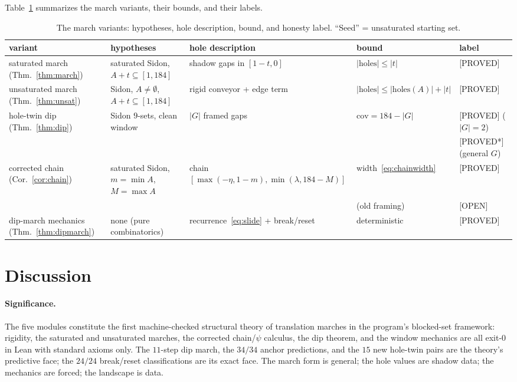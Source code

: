 \documentclass[11pt,a4paper]{article}
\theoremstyle{definition}
\begin{document}
Table~\ref{tab:variants} summarizes the march variants, their bounds,
and their labels.

\begin{table}[t]
  \centering
  \caption{The march variants: hypotheses, hole description, bound,
    and honesty label. ``Seed'' = unsaturated starting set.}
  \label{tab:variants}
  \begin{tabular}{lllll}
    \toprule
    variant & hypotheses & hole description & bound & label \\
    \midrule
    saturated march (Thm.~\ref{thm:march})
      & saturated Sidon, $A+t\subseteq[1,184]$
      & shadow gaps in $[1-t,0]$
      & $|\mathrm{holes}|\le|t|$ & [PROVED] \\
    unsaturated march (Thm.~\ref{thm:unsat})
      & Sidon, $A\ne\emptyset$, $A+t\subseteq[1,184]$
      & rigid conveyor + edge term
      & $|\mathrm{holes}|\le|\mathrm{holes}(A)|+|t|$ & [PROVED] \\
    hole-twin dip (Thm.~\ref{thm:dip})
      & Sidon $9$-sets, clean window
      & $|G|$ framed gaps
      & $\mathrm{cov}=184-|G|$ & [PROVED] ($|G|=2$) \\
      & & & & [PROVED*] (general $G$) \\
    corrected chain (Cor.~\ref{cor:chain})
      & saturated Sidon, $m=\min A$, $M=\max A$
      & chain $[\max(-\eta,1-m),\min(\lambda,184-M)]$
      & width~\eqref{eq:chainwidth} & [PROVED] \\
      &&& (old framing) & [OPEN] \\
    dip-march mechanics (Thm.~\ref{thm:dipmarch})
      & none (pure combinatorics)
      & recurrence~\eqref{eq:slide} + break/reset
      & deterministic & [PROVED] \\
    \bottomrule
  \end{tabular}
\end{table}

\section{Discussion}

\paragraph{Significance.} The five modules constitute the first
machine-checked structural theory of translation marches in the
program's blocked-set framework: rigidity, the saturated and
unsaturated marches, the corrected chain/$\psi$ calculus, the dip
theorem, and the window mechanics are all exit-0 in Lean with standard
axioms only. The $11$-step dip march, the $34/34$ anchor predictions,
and the $15$ new hole-twin pairs are the theory's predictive face;
the $24/24$ break/reset classifications are its exact face. The
march form is general; the hole values are shadow data; the mechanics
are forced; the landscape is data.
\end{document}
